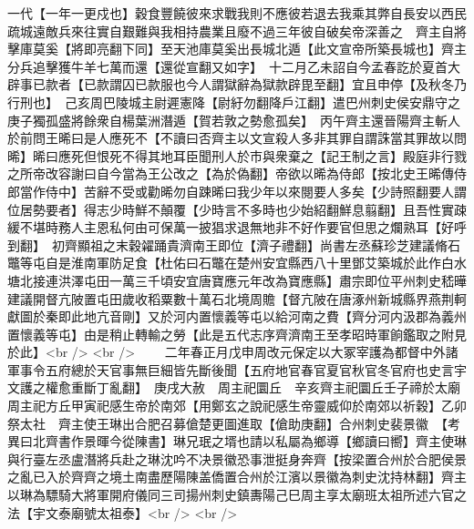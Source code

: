 一代【一年一更戍也】穀食豐饒彼來求戰我則不應彼若退去我乘其弊自長安以西民疏城遠敵兵來往實自艱難與我相持農業且廢不過三年彼自破矣帝深善之　齊主自將擊庫莫奚【將即亮翻下同】至天池庫莫奚出長城北遁【此文宣帝所築長城也】齊主分兵追擊獲牛羊七萬而還【還從宣翻又如字】　十二月乙未詔自今孟春訖於夏首大辟事已款者【已款謂囚已款服也今人謂獄辭為獄款辟毘至翻】宜且申停【及秋冬乃行刑也】　己亥周巴陵城主尉遲憲降【尉紆勿翻降戶江翻】遣巴州刺史侯安鼎守之庚子獨孤盛將餘衆自楊葉洲潛遁【賀若敦之勢愈孤矣】　丙午齊主還晉陽齊主斬人於前問王晞曰是人應死不【不讀曰否齊主以文宣殺人多非其罪自謂誅當其罪故以問晞】晞曰應死但恨死不得其地耳臣聞刑人於市與衆棄之【記王制之言】殿庭非行戮之所帝改容謝曰自今當為王公改之【為於偽翻】帝欲以晞為侍郎【按北史王晞傳侍郎當作侍中】苦辭不受或勸晞勿自踈晞曰我少年以來閱要人多矣【少詩照翻要人謂位居勢要者】得志少時鮮不顛覆【少時言不多時也少始紹翻鮮息翦翻】且吾性實疎緩不堪時務人主恩私何由可保萬一披猖求退無地非不好作要官但思之爛熟耳【好呼到翻】　初齊顯祖之末穀糴踊貴濟南王即位【濟子禮翻】尚書左丞蘇珍芝建議脩石鼈等屯自是淮南軍防足食【杜佑曰石鼈在楚州安宜縣西八十里鄧艾築城於此作白水塘北接連洪澤屯田一萬三千頃安宜唐寶應元年改為寶應縣】肅宗即位平州刺史嵇曄建議開督亢陂置屯田歲收稻粟數十萬石北境周贍【督亢陂在唐涿州新城縣界燕荆軻獻圖於秦即此地亢音剛】又於河内置懷義等屯以給河南之費【齊分河内汲郡為義州置懷義等屯】由是稍止轉輸之勞【此是五代志序齊濟南王至孝昭時軍餉鑑取之附見於此】<br />
<br />
　　二年春正月戊申周改元保定以大冢宰護為都督中外諸軍事令五府總於天官事無巨細皆先斷後聞【五府地官春官夏官秋官冬官府也史言宇文護之權愈重斷丁亂翻】　庚戌大赦　周主祀圜丘　辛亥齊主祀圜丘壬子禘於太廟　周主祀方丘甲寅祀感生帝於南郊【用鄭玄之說祀感生帝靈威仰於南郊以祈穀】乙卯祭太社　齊主使王琳出合肥召募傖楚更圖進取【傖助庚翻】合州刺史裴景徽　【考異曰北齊書作景暉今從陳書】琳兄珉之壻也請以私屬為鄉導【鄉讀曰嚮】齊主使琳與行臺左丞盧潛將兵赴之琳沈吟不决景徽恐事泄挺身奔齊【按梁置合州於合肥侯景之亂已入於齊齊之境土南盡歷陽陳盖僑置合州於江濱以景徽為刺史沈持林翻】齊主以琳為驃騎大將軍開府儀同三司揚州刺史鎮夀陽己巳周主享太廟班太祖所述六官之法【宇文泰廟號太祖泰】<br />
<br />
